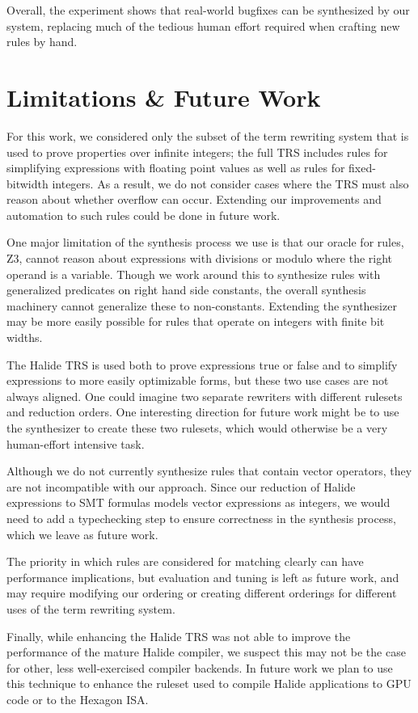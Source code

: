 \documentclass[sigplan,10pt,review,anonymous]{acmart}\settopmatter{printfolios=true,printccs=false,printacmref=false}
\begin{document}
Overall, the experiment shows that real-world bugfixes can be synthesized by
our system, replacing much of the tedious human effort required when crafting
new rules by hand.

\section{Limitations \& Future Work}
For this work, we considered only the subset of the term rewriting system that
is used to prove properties over infinite integers; the full TRS includes rules
for simplifying expressions with floating point values as well as rules for
fixed-bitwidth integers.  As a result, we do not consider cases where the TRS
must also reason about whether overflow can occur.  Extending our improvements
and automation to such rules could be done in future work.

One major limitation of the synthesis process we use is that our oracle
for rules, Z3, cannot reason about expressions with divisions or modulo
where the right operand is a variable.  Though we work around this to
synthesize rules with generalized predicates on right hand side constants,
the overall synthesis machinery cannot generalize these to non-constants.
Extending the synthesizer may be more easily possible for rules that operate
on integers with finite bit widths.

The Halide TRS is used both to prove expressions true or false and to
simplify expressions to more easily optimizable forms, but these two use cases
are not always aligned. One could imagine two separate rewriters with
different rulesets and reduction orders. One interesting direction for future
work might be to use the synthesizer to create these two rulesets, which would
otherwise be a very human-effort intensive task.

Although we do not currently synthesize rules that contain vector operators,
they are not incompatible with our approach. Since our reduction of Halide
expressions to SMT formulas models vector expressions as integers, we would need
to add a typechecking step to ensure correctness in the synthesis process, which
we leave as future work.

The priority in which rules are considered for matching clearly can have
performance implications, but evaluation and tuning is left as future work, and
may require modifying our ordering or creating different orderings for different
uses of the term rewriting system.

Finally, while enhancing the Halide TRS was not able to improve the performance of the mature Halide compiler, we suspect this may not be the case for other, less well-exercised compiler backends. In future work we plan to use this technique to enhance the ruleset used to compile Halide applications to GPU code or to the Hexagon ISA.
\end{document}
